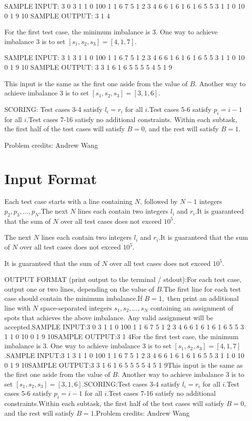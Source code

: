 \documentclass[12pt]{article}
\begin{document}
SAMPLE INPUT:
3 0
3
1 1
0 100
1 1
6 7
5
1 2 3 4
6 6
1 6
1 6
1 6
5 5
3
1 1
0 10
0 1
9 10
SAMPLE OUTPUT: 
3
1
4

For the first test case, the minimum imbalance is $3$. One way to achieve
imbalance $3$ is to set $[s_1,s_2,s_3]=[4,1,7]$.

SAMPLE INPUT:
3 1
3
1 1
0 100
1 1
6 7
5
1 2 3 4
6 6
1 6
1 6
1 6
5 5
3
1 1
0 10
0 1
9 10
SAMPLE OUTPUT: 
3
3 1 6
1
6 5 5 5 5
4
5 1 9

This input is the same as the first one aside from the value of $B$. Another way
to achieve imbalance $3$ is to set $[s_1,s_2,s_3]=[3,1,6]$.

SCORING:
Test cases 3-4 satisfy $l_i=r_i$ for all $i$.Test cases 5-6 satisfy $p_i=i-1$ for all $i$.Test cases 7-16 satisfy no additional constraints.
Within each subtask, the first half of the test cases will satisfy $B=0$, and
the rest will satisfy $B=1$.



Problem credits: Andrew Wang



\section*{Input Format}
Each test case starts with a line containing $N$, followed by $N-1$ integers
$p_2,p_3,\ldots,p_N$.The next $N$ lines each contain two integers $l_i$ and $r_i$.It is guaranteed that the sum of $N$ over all test cases does not exceed $10^5$.

The next $N$ lines each contain two integers $l_i$ and $r_i$.It is guaranteed that the sum of $N$ over all test cases does not exceed $10^5$.

It is guaranteed that the sum of $N$ over all test cases does not exceed $10^5$.

OUTPUT FORMAT (print output to the terminal / stdout):For each test case, output one or two lines, depending on the value of $B$.The first line for each test case should contain the minimum imbalance.If $B=1,$ then print an additional line with $N$ space-separated integers
$s_1,s_2,\ldots, s_N$ containing an assignment of spots that achieves the above
imbalance. Any valid assignment will be accepted.SAMPLE INPUT:3 0
3
1 1
0 100
1 1
6 7
5
1 2 3 4
6 6
1 6
1 6
1 6
5 5
3
1 1
0 10
0 1
9 10SAMPLE OUTPUT:3
1
4For the first test case, the minimum imbalance is $3$. One way to achieve
imbalance $3$ is to set $[s_1,s_2,s_3]=[4,1,7]$.SAMPLE INPUT:3 1
3
1 1
0 100
1 1
6 7
5
1 2 3 4
6 6
1 6
1 6
1 6
5 5
3
1 1
0 10
0 1
9 10SAMPLE OUTPUT:3
3 1 6
1
6 5 5 5 5
4
5 1 9This input is the same as the first one aside from the value of $B$. Another way
to achieve imbalance $3$ is to set $[s_1,s_2,s_3]=[3,1,6]$.SCORING:Test cases 3-4 satisfy $l_i=r_i$ for all $i$.Test cases 5-6 satisfy $p_i=i-1$ for all $i$.Test cases 7-16 satisfy no additional constraints.Within each subtask, the first half of the test cases will satisfy $B=0$, and
the rest will satisfy $B=1$.Problem credits: Andrew Wang
\end{document}
